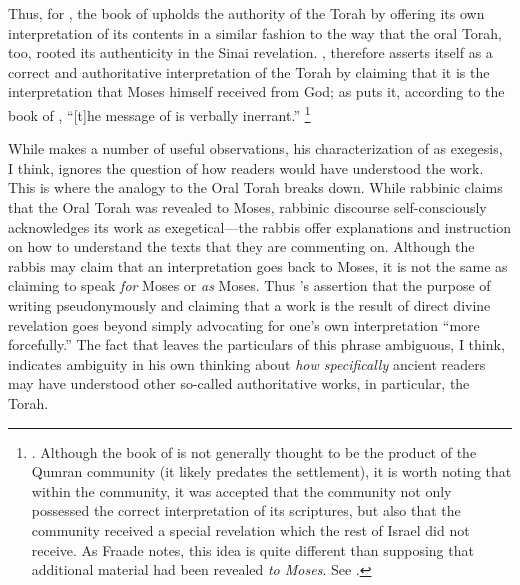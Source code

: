 Thus, for \vanderkam, the book of \jub upholds the authority of the Torah by offering its own interpretation of its contents in a similar fashion to the way that the oral Torah, too, rooted its authenticity in the Sinai revelation. \jub, therefore asserts itself as a correct and authoritative interpretation of the Torah by claiming that it is the interpretation that Moses himself received from God; as \vanderkam puts it, according to the book of \jub, ``[t]he message of \jub is verbally inerrant.''%
    \footnote{
        \cite[33]{vanderkam_metso-etal2010}.
        Although the book of \jub is not generally thought to be the product of the Qumran community (it likely predates the settlement), it is worth noting that within the community, it was accepted that the community not only possessed the correct interpretation of its scriptures, but also that the community received a special revelation which the rest of Israel did not receive. As Fraade notes, this idea is quite different than supposing that additional material had been revealed \emph{to Moses}. See 
        \cite[67]{fraade_jjs1993}.}

While \vanderkam makes a number of useful observations, his characterization of \jub as exegesis, I think, ignores the question of how readers would have understood the work. This is where the analogy to the Oral Torah breaks down. While rabbinic claims that the Oral Torah was revealed to Moses, rabbinic discourse self-consciously acknowledges its work as exegetical---the rabbis offer explanations and instruction on how to understand the texts that they are commenting on. Although the rabbis may claim that an interpretation goes back to Moses, it is not the same as claiming to speak \emph{for} Moses or \emph{as} Moses. Thus \vanderkam's assertion that the purpose of writing pseudonymously and claiming that a work is the result of direct divine revelation goes beyond simply advocating for one's own interpretation ``more forcefully.'' The fact that \vanderkam leaves the particulars of this phrase ambiguous, I think, indicates ambiguity in his own thinking about \emph{how specifically} ancient readers may have understood \jub \visavis other so-called authoritative works, in particular, the Torah.

